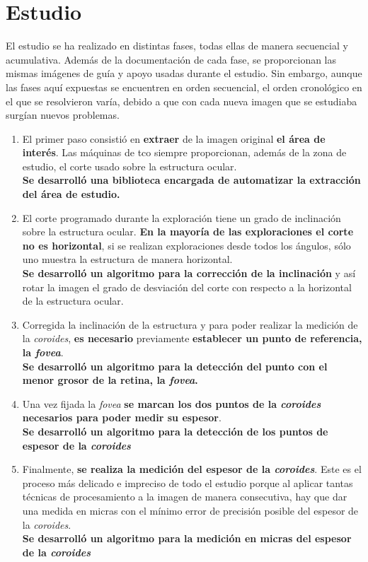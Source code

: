 \section{Estudio}
El estudio se ha realizado en distintas fases, todas ellas de manera
secuencial y acumulativa. Además de la documentación de cada fase, se
proporcionan las mismas imágenes de guía y apoyo usadas durante el
estudio.  Sin embargo, aunque las fases aquí expuestas se encuentren
en orden secuencial, el orden cronológico en el que se resolvieron
varía, debido a que con cada nueva imagen que se estudiaba surgían
nuevos problemas.
\begin{enumerate}
\item El primer paso consistió en \textbf{extraer} de la imagen
  original \textbf{el área de interés}. Las máquinas de \gls{tco} siempre
  proporcionan, además
  de la zona de estudio, el corte usado sobre la estructura ocular. \\
  \textbf{Se desarrolló una biblioteca encargada de automatizar la
    extracción del área de estudio.}
\item El corte programado durante la exploración tiene un grado de
  inclinación sobre la estructura ocular. \textbf{En la mayoría de las
    exploraciones el corte no es horizontal}, si se realizan
  exploraciones desde todos los ángulos, sólo uno muestra la
  estructura
  de manera horizontal. \\
  \textbf{Se desarrolló un algoritmo para la corrección de la
    inclinación} y así rotar la imagen el grado de desviación del
  corte con respecto a la horizontal de la estructura ocular.
\item Corregida la inclinación de la estructura y para poder realizar
  la medición de la \emph{\gls{coroides}}, \textbf{es necesario}
  previamente
  \textbf{establecer un punto de referencia, la \emph{\gls{fovea}}}. \\
  \textbf{Se desarrolló un algoritmo para la detección del punto con
    el menor grosor de la retina, la \emph{\gls{fovea}}.}
\item Una vez fijada la \emph{\gls{fovea}} \textbf{se marcan los dos
    puntos
    de la \emph{\gls{coroides}} necesarios para poder medir su espesor}. \\
  \textbf{Se desarrolló un algoritmo para la detección de los puntos
    de espesor de la \emph{\gls{coroides}}}
\item Finalmente, \textbf{se realiza la medición del espesor de la
    \emph{\gls{coroides}}}. Este es el proceso más delicado e
  impreciso de todo el estudio porque al aplicar tantas técnicas de
  procesamiento a la imagen de manera consecutiva, hay que dar una
  medida en micras con el mínimo error de precisión posible del
  espesor de la \emph{\gls{coroides}}. \\
  \textbf{Se desarrolló un algoritmo para la medición en micras del
    espesor de la \emph{\gls{coroides}}}
\end{enumerate}

